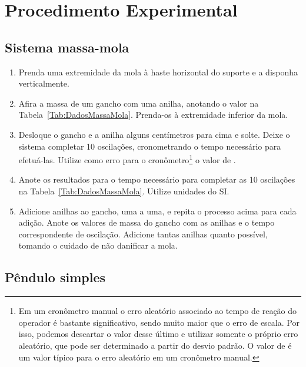 \section{Procedimento Experimental}

\subsection{Sistema massa-mola}

\begin{enumerate}
\item Prenda uma extremidade da mola à haste horizontal do suporte e a disponha verticalmente.
\item Afira a massa de um gancho com uma anilha, anotando o valor na Tabela~\ref{Tab:DadosMassaMola}. Prenda-os à extremidade inferior da mola.
\item Desloque o gancho e a anilha alguns centímetros para cima e solte. Deixe o sistema completar 10 oscilações, cronometrando o tempo necessário para efetuá-las. Utilize como erro para o cronômetro\footnote{Em um cronômetro manual o erro aleatório associado ao tempo de reação do operador é bastante significativo, sendo muito maior que o erro de escala. Por isso, podemos descartar o valor desse último e utilizar somente o próprio erro aleatório, que pode ser determinado a partir do desvio padrão. O valor de  é um valor típico para o erro aleatório em um cronômetro manual.} o valor de .
\item Anote os resultados para o tempo necessário para completar as 10 oscilações na Tabela~\ref{Tab:DadosMassaMola}. Utilize unidades do SI.
\item Adicione anilhas ao gancho, uma a uma, e repita o processo acima para cada adição. Anote os valores de massa do gancho com as anilhas e o tempo correspondente de oscilação. Adicione tantas anilhas quanto possível, tomando o cuidado de não danificar a mola.
\end{enumerate}

\subsection{Pêndulo simples}

